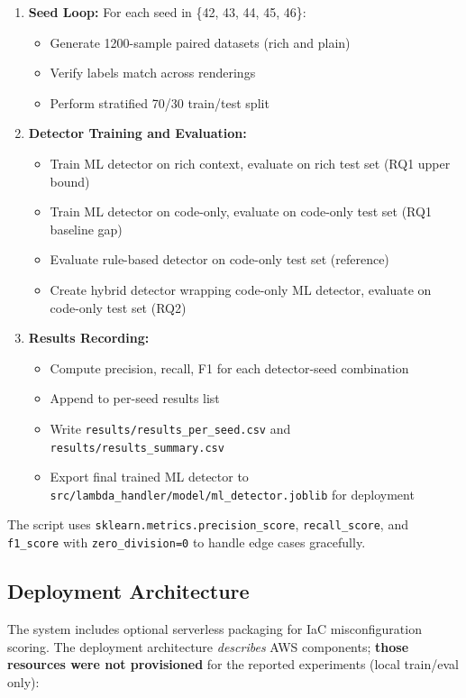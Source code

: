 \begin{enumerate}
  \item \textbf{Seed Loop:} For each seed in \{42, 43, 44, 45, 46\}:
  \begin{itemize}
    \item Generate 1200-sample paired datasets (rich and plain)
    \item Verify labels match across renderings
    \item Perform stratified 70/30 train/test split
  \end{itemize}
  
  \item \textbf{Detector Training and Evaluation:}
  \begin{itemize}
    \item Train ML detector on rich context, evaluate on rich test set (RQ1 upper bound)
    \item Train ML detector on code-only, evaluate on code-only test set (RQ1 baseline gap)
    \item Evaluate rule-based detector on code-only test set (reference)
    \item Create hybrid detector wrapping code-only ML detector, evaluate on code-only test set (RQ2)
  \end{itemize}
  
  \item \textbf{Results Recording:}
  \begin{itemize}
    \item Compute precision, recall, F1 for each detector-seed combination
    \item Append to per-seed results list
    \item Write \texttt{results/results\_per\_seed.csv} and \texttt{results/results\_summary.csv}
    \item Export final trained ML detector to \texttt{src/lambda\_handler/model/ml\_detector.joblib} for deployment
  \end{itemize}
\end{enumerate}

The script uses \texttt{sklearn.metrics.precision\_score}, \texttt{recall\_score}, and \texttt{f1\_score} with \texttt{zero\_division=0} to handle edge cases gracefully.

\subsection{Deployment Architecture}

The system includes optional serverless packaging for IaC misconfiguration scoring. The deployment architecture \emph{describes} AWS components; \textbf{those resources were not provisioned} for the reported experiments (local train/eval only):

